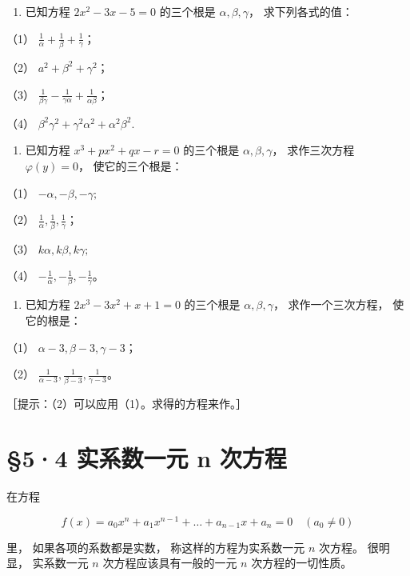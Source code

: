 \begin{enumerate}
\item
  已知方程 \(2x^{2} - 3x - 5 = 0\) 的三个根是
  \(\alpha, \beta, \gamma\)， 求下列各式的值：
\end{enumerate}

（1） \(\frac{1}{\alpha} + \frac{1}{\beta} + \frac{1}{\gamma}\)；

（2） \(a^2 + \beta^2 + \gamma^2\)；

（3）
\(\frac{1}{\beta\gamma} - \frac{1}{\gamma\alpha} + \frac{1}{\alpha\beta}\)；

（4） \(\beta^2\gamma^2 +\gamma^2\alpha^2 +\alpha^2\beta^2.\)

\begin{enumerate}[start=2]
\item
  已知方程 \(x^{3} + px^{2} + qx - r = 0\) 的三个根是
  \(\alpha, \beta, \gamma\)， 求作三次方程 \(\varphi(y) = 0\)，
  使它的三个根是：
\end{enumerate}

（1） \(-\alpha, -\beta, -\gamma;\)

（2） \(\frac{1}{\alpha}, \frac{1}{\beta}, \frac{1}{\gamma}\)；

（3） \(k\alpha, k\beta, k\gamma;\)

（4） \(-\frac{1}{\alpha}, -\frac{1}{\beta}, -\frac{1}{\gamma}\)。

\begin{enumerate}[start=3]
\item
  已知方程 \(2x^{3} - 3x^{2} + x + 1 = 0\) 的三个根是
  \(\alpha, \beta, \gamma\)， 求作一个三次方程， 使它的根是：
\end{enumerate}

（1） \(\alpha - 3, \beta - 3, \gamma - 3\)；

（2）
\(\frac{1}{\alpha - 3}, \frac{1}{\beta - 3}, \frac{1}{\gamma - 3}\)。

［提示：（2）可以应用（1）。求得的方程来作。］

\section{§5·4 实系数一元 n 次方程}

在方程

\[
f (x) = a _ {0} x ^ {n} + a _ {1} x ^ {n - 1} + \dots + a _ {n - 1} x + a _ {n} = 0 \quad (a _ {0} \neq 0)
\]

里， 如果各项的系数都是实数， 称这样的方程为实系数一元 \(n\) 次方程。
很明显， 实系数一元 \(n\) 次方程应该具有一般的一元 \(n\)
次方程的一切性质。

